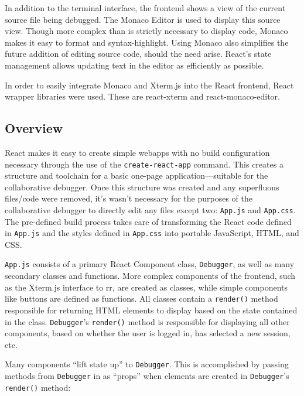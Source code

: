 \documentclass[12pt]{article}
\begin{document}
In addition to the terminal interface, the frontend shows a view of
the current source file being debugged.  The Monaco Editor
\cite{monaco} is used to display this source view.  Though more
complex than is strictly necessary to display code, Monaco makes it
easy to format and syntax-highlight.  Using Monaco also simplifies the
future addition of editing source code, should the need arise.
React's state management allows updating text in the editor as
efficiently as possible.

In order to easily integrate Monaco and Xterm.js into the React
frontend, React wrapper libraries were used.  These are
react-xterm\cite{reactxterm} and
react-monaco-editor\cite{reactmonaco}.

\subsection{Overview}

React makes it easy to create simple webapps with no build
configuration necessary through the use of the
\lstinline{create-react-app} command.  This creates a structure and
toolchain for a basic one-page application---suitable for the
collaborative debugger.  Once this structure was created and any
superfluous files/code were removed, it's wasn't necessary for the
purposes of the collaborative debugger to directly edit any files
except two: \lstinline{App.js} and \lstinline{App.css}.  The
pre-defined build process takes care of transforming the React code
defined in \lstinline{App.js} and the styles defined in
\lstinline{App.css} into portable JavaScript, HTML, and CSS.
\par

\lstinline{App.js} consists of a primary React Component class,
\lstinline{Debugger}, as well as many secondary classes and functions.
More complex components of the frontend, such as the Xterm.js
interface to rr, are created as classes, while simple components like
buttons are defined as functions.  All classes contain a
\lstinline{render()} method responsible for returning HTML elements to
display based on the state contained in the class.
\lstinline{Debugger}'s \lstinline{render()} method is responsible for
displaying all other components, based on whether the user is logged
in, has selected a new session, etc.
\par

Many components ``lift state up'' to \lstinline{Debugger}.  This is
accomplished by passing methods from \lstinline{Debugger} in as
``props'' when elements are created in \lstinline{Debugger}'s
\lstinline{render()} method:
\end{document}
